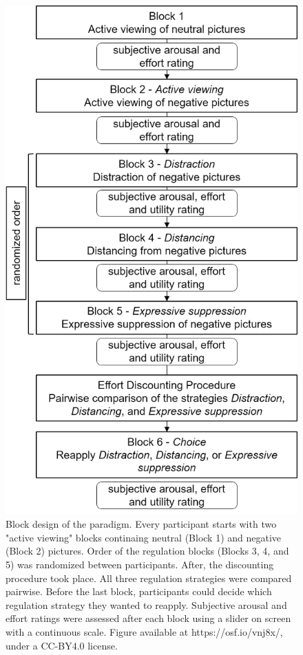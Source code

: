 \documentclass[
  man,floatsintext]{apa6}
\begin{document}
\begin{figure}
\includegraphics[width=\textwidth]{figures/Design_ER-ED} \caption{Block design of the paradigm. Every participant starts with two "active viewing" blocks continaing neutral (Block 1) and negative (Block 2) pictures. Order of the regulation blocks (Blocks 3, 4, and 5) was randomized between participants. After, the discounting procedure took place. All three regulation strategies were compared pairwise. Before the last block, participants could decide which regulation strategy they wanted to reapply. Subjective arousal and effort ratings were assessed after each block using a slider on screen with a continuous scale. Figure available at https://osf.io/vnj8x/, under a CC-BY4.0 license.}\label{fig:DesignERED}
\end{figure}
\end{document}
